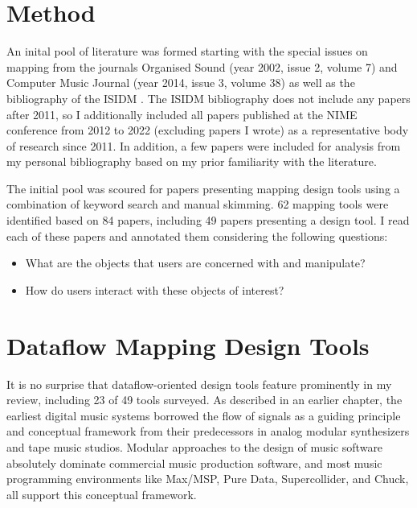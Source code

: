 \documentclass[main.tex]{subfiles}
\begin{document}
\section{Method}

An inital pool of literature was formed starting with the special issues on
mapping from the journals Organised Sound (year 2002, issue 2, volume 7) and
Computer Music Journal (year 2014, issue 3, volume 38) as well as the
bibliography of the ISIDM \cite{isidm-bibliography}. The ISIDM bibliography
does not include any papers after 2011, so I additionally included all papers
published at the NIME conference from 2012 to 2022 (excluding papers
I wrote) as a representative body of research since 2011. In addition, a few
papers were included for analysis from my personal bibliography based on my
prior familiarity with the literature.


The initial pool was scoured for papers presenting mapping design tools using a
combination of keyword search and manual skimming.  62 mapping tools were
identified based on 84 papers, including 49 papers presenting a design tool.  I
read each of these papers and annotated them considering the following
questions:

\begin{itemize}
    \item What are the objects that users are concerned with and manipulate?
    \item How do users interact with these objects of interest?
\end{itemize}

\section{Dataflow Mapping Design Tools}



It is no surprise that dataflow-oriented design tools feature prominently in my
review, including 23 of 49 tools surveyed. As described in an earlier chapter,
the earliest digital music systems borrowed the flow of signals as a guiding
principle and conceptual framework from their predecessors in analog modular
synthesizers and tape music studios. Modular approaches to the design of music
software absolutely dominate commercial music production software, and most
music programming environments like Max/MSP, Pure Data, Supercollider, and
Chuck, all support this conceptual framework.
\end{document}
